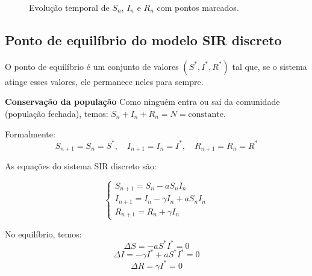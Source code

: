 \documentclass{article}
\begin{document}
\begin{figure}[ht]
\begin{subfigure}{0.3\textwidth}
    \centering
  \end{subfigure}
  
  \caption{Evolução temporal de $S_n$, $I_n$ e $R_n$ com pontos
    marcados.}
\end{figure}

\subsection*{Ponto de equilíbrio do modelo SIR discreto}

O ponto de equilíbrio é um conjunto de valores $(S^*, I^*, R^*)$ tal
que, se o sistema atinge esses valores, ele permanece neles para
sempre.

\noindent\textbf{Conservação da população} Como ninguém entra ou sai da
comunidade (população fechada), temos:
$S_n+I_n+R_n=N=\text{constante}$.

Formalmente:
\[
S_{n+1} = S_n = S^*, \quad I_{n+1} = I_n = I^*, \quad R_{n+1} = R_n = R^*
\]

As equações do sistema SIR discreto são:

\[
\begin{cases}
S_{n+1} = S_n - a S_n I_n \\
I_{n+1} = I_n - \gamma I_n + a S_n I_n \\
R_{n+1} = R_n + \gamma I_n
\end{cases}
\]

No equilíbrio, temos:
\[
\Delta S = -a S^* I^* = 0
\]
\[
\Delta I = -\gamma I^* + a S^* I^* = 0
\]
\[
\Delta R = \gamma I^* = 0
\]
\end{document}
